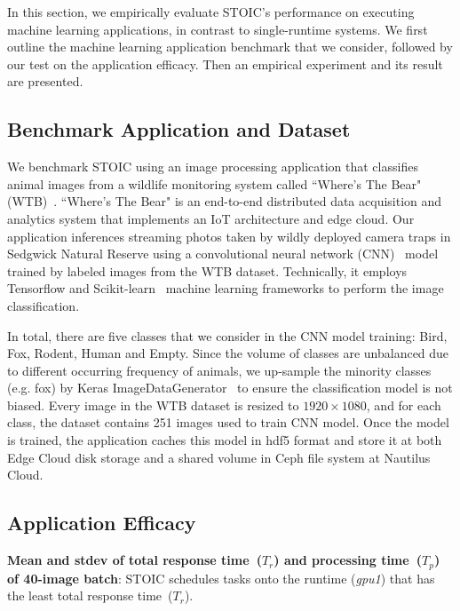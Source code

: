 In this section, we empirically evaluate STOIC's performance on executing machine learning applications, in contrast to single-runtime systems. We first outline the machine learning application benchmark that we consider, followed by our test on the application efficacy. Then an empirical experiment and its result are presented.

\subsection{Benchmark Application and Dataset}

We benchmark STOIC using an image processing application that classifies animal images from a wildlife monitoring system called ``Where's The Bear" (WTB)~\cite{ref:wtb}. ``Where's The Bear" is an end-to-end distributed data acquisition and analytics system that implements an IoT architecture and edge cloud. Our application inferences streaming photos taken by wildly deployed camera traps in Sedgwick Natural Reserve using a convolutional neural network (CNN)~\cite{ref:cnn} model trained by labeled images from the WTB dataset. Technically, it employs Tensorflow and Scikit-learn~\cite{ref:scikit} machine learning frameworks to perform the image classification.  

 In total, there are five classes that we consider in the CNN model training: Bird, Fox, Rodent, Human and Empty. Since the volume of classes are unbalanced due to different occurring frequency of animals, we up-sample the minority classes (e.g. fox) by Keras ImageDataGenerator~\cite{ref:keras} to ensure the classification model is not biased. Every image in the WTB dataset is resized to $1920 \times 1080$, and for each class, the dataset contains 251 images used to train CNN model. Once the model is trained, the application caches this model in hdf5 format and store it at both Edge Cloud disk storage and a shared volume in Ceph file system at Nautilus Cloud. 

\subsection{Application Efficacy}

\begin{table}[t] \centering 

\caption{\textbf{Mean and stdev of total response time~($T_r$) and processing time~($T_p$) of 40-image batch}: STOIC schedules tasks onto the runtime (\textit{gpu1}) that has the least total response time~($T_r$).
\label{tab:validation}}
\end{table}

